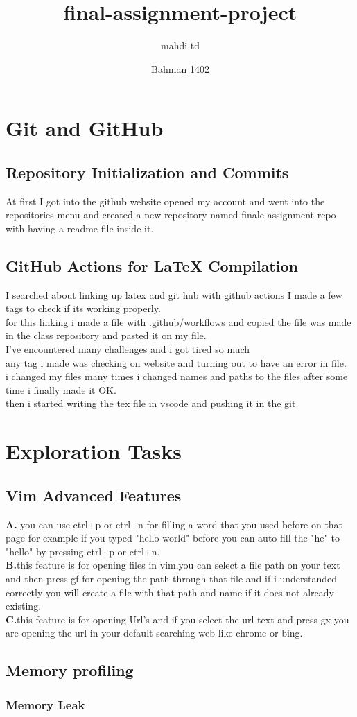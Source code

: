 \documentclass{article}
\title{final-assignment-project}
\author{mahdi td}
\date{Bahman 1402}
\begin{document}
\maketitle
\newpage
\section{Git and GitHub}
\subsection{Repository Initialization and Commits}
At first I got into the github website opened my account and went into the repositories menu and created a new repository named finale-assignment-repo with having a readme file inside it.
\subsection{GitHub Actions for LaTeX Compilation}
I searched about linking up latex and git hub with github actions I made a few tags to check if its working properly.\\
for this linking i made a file with .github/workflows and copied the file was made in the class repository and pasted it on my file.\\
I've encountered many challenges and i got tired so much\\
any tag i made was checking on website and turning out to have an error in file.\\
i changed my files many times i changed names and paths to the files after some time i finally made it OK.\\
then i started writing the tex file in vscode and pushing it in the git.
\section{ Exploration Tasks}
\subsection{Vim Advanced Features}
\textbf{A.}  you can use ctrl+p or ctrl+n for filling a word that you used before on that page for example if you typed "hello world" before you can auto fill the "he" to "hello" by pressing ctrl+p or ctrl+n.\\
\textbf{B.}this feature is for opening files in vim.you can select a file path on your text and then press gf for opening the path through that file and if i understanded correctly you will create a file with that path and name if it does not already existing.\\
\textbf{C.}this feature is for opening Url's and if you select the url text and press gx you are opening the url in your default searching web like chrome or bing.\\
\subsection{Memory profiling}
\subsubsection{Memory Leak}
\end{document}
